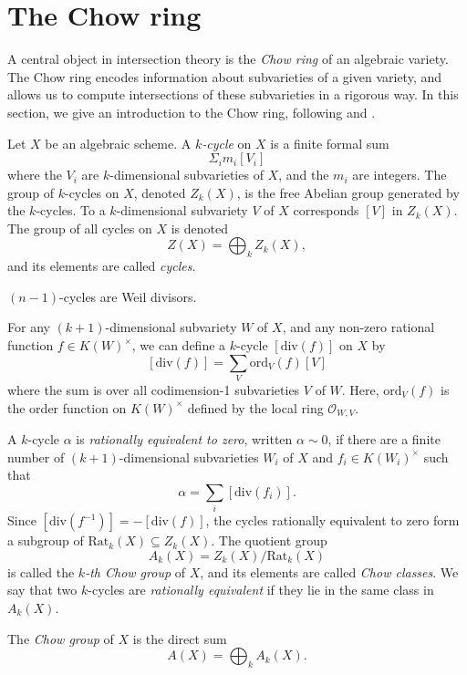 \section{The Chow ring}

A central object in intersection theory is the \emph{Chow ring} of an algebraic variety. The Chow ring encodes information about subvarieties of a given variety, and allows us to compute intersections of these subvarieties in a rigorous way. In this section, we give an introduction to the Chow ring, following \cite[Section 1.3]{FUL84} and \cite[Section 1.2]{EH16}.

Let $X$ be an algebraic scheme. A \emph{$k$-cycle} on $X$ is a finite formal sum 
\[
    \Sigma_i m_i [V_i]
\]
where the $V_i$ are $k$-dimensional subvarieties of $X$, and the $m_i$ are integers. The group of $k$-cycles on $X$, denoted $Z_k(X)$, is the free Abelian group generated by the $k$-cycles. To a $k$-dimensional subvariety $V$ of $X$ corresponds $[V]$ in $Z_k(X)$. The group of all cycles on $X$ is denoted 
\[Z(X) = \bigoplus_k Z_k(X),\]
and its elements are called \emph{cycles}.

\begin{remark}
    $(n-1)$-cycles are Weil divisors.
\end{remark}

For any $(k+1)$-dimensional subvariety $W$ of $X$, and any non-zero rational function $f \in K(W)^\times$, we can define a $k$-cycle $[\text{div}(f)]$ on $X$ by
\[
    [\text{div}(f)] = \sum_V \text{ord}_V(f) [V]
\]
where the sum is over all codimension-1 subvarieties $V$ of $W$. Here, $\text{ord}_V(f)$ is the order function on $K(W)^\times$ defined by the local ring $\mathcal{O}_{W,V}$. 

A $k$-cycle $\alpha$ is \emph{rationally equivalent to zero}, written $\alpha \sim 0$, if there are a finite number of $(k+1)$-dimensional subvarieties $W_i$ of $X$ and $f_i \in K(W_i)^\times$ such that
\[
    \alpha = \sum_{i} [\text{div}(f_i)].
\]
Since $[\text{div}(f^{-1})] = -[\text{div}(f)]$, the cycles rationally equivalent to zero form a subgroup of $\text{Rat}_k(X) \subseteq Z_k(X)$. The quotient group 
\[A_k(X) = Z_k(X)/\text{Rat}_k(X)\]
is called the \emph{$k$-th Chow group} of $X$, and its elements are called \emph{Chow classes}. We say that two $k$-cycles are \emph{rationally equivalent} if they lie in the same class in $A_k(X)$.

\begin{definition}
    The \emph{Chow group} of $X$ is the direct sum 
    \[A(X) = \bigoplus_k A_k(X).\]
\end{definition}

